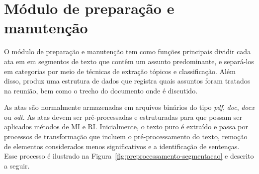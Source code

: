 \section{Módulo de preparação e manutenção}\label{sec:modulo-preparacao}

O módulo de preparação e manutenção tem como funções principais dividir cada ata em em segmentos de texto que contêm um assunto predominante, e separá-los em categorias por meio de técnicas de extração tópicos e classificação. Além disso, produz uma estrutura de dados que registra quais assuntos foram tratados na reunião, bem como o trecho do documento onde é discutido.  






As atas são normalmente armazenadas em arquivos binários do tipo \textit{pdf}, \textit{doc}, \textit{docx} ou \textit{odt}. As atas devem ser pré-processadas e estruturadas para que possam ser aplicados métodos de MI e RI. Inicialmente, o texto puro é extraído e passa por processos de transformação que incluem o pré-processamento do texto, remoção de elementos considerados menos significativos e a identificação de sentenças. Esse processo é ilustrado na Figura~\ref{fig:preprocessamento-segmentacao} e descrito a seguir.

	

